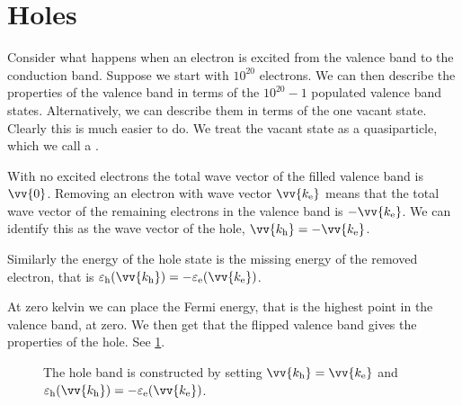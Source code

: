 \documentclass[fleqn]{NotesClass}
\begin{document}
    \section{Holes}
    Consider what happens when an electron is excited from the valence band to the conduction band.
    Suppose we start with \(10^{20}\) electrons.
    We can then describe the properties of the valence band in terms of the \(10^{20} - 1\) populated valence band states.
    Alternatively, we can describe them in terms of the one vacant state.
    Clearly this is much easier to do.
    We treat the vacant state as a quasiparticle, which we call a .
    
    With no excited electrons the total wave vector of the filled valence band is \(\vv{0}\).
    Removing an electron with wave vector \(\vv{k_{\mathrm{e}}}\) means that the total wave vector of the remaining electrons in the valence band is \(-\vv{k_{\mathrm{e}}}\).
    We can identify this as the wave vector of the hole, \(\vv{k_{\mathrm{h}}} = -\vv{k_{\mathrm{e}}}\).
    
    Similarly the energy of the hole state is the missing energy of the removed electron, that is \(\varepsilon_{\mathrm{h}}(\vv{k_{\mathrm{h}}}) = -\varepsilon_{\mathrm{e}}(\vv{k_{\mathrm{e}}})\).
    
    At zero kelvin we can place the Fermi energy, that is the highest point in the valence band, at zero.
    We then get that the flipped valence band gives the properties of the hole.
    See \cref{fig:hole band}.
    
    \begin{figure}
        \caption[Hole band.]{The hole band is constructed by setting \(\vv{k_{\mathrm{h}}} = \vv{k_{\mathrm{e}}}\) and \(\varepsilon_{\mathrm{h}}(\vv{k_{\mathrm{h}}}) = -\varepsilon_{\mathrm{e}}(\vv{k_{\mathrm{e}}})\).}
        \label{fig:hole band}
    \end{figure}
\end{document}
